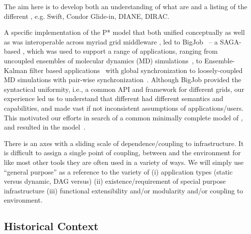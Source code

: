\documentclass{sig-alternate}
\begin{document}
The aim here is to develop both an understanding of what \pilotjobs
are and a listing of the different \pilotjobs, e.g. Swift, Condor
Glide-in, DIANE, DIRAC.


A specific implementation of the P* model that both unified
conceptually as well as was interoperable across myriad grid
middleware , led to 
BigJob~\cite{saga_bigjob_condor_cloud} -- a
SAGA-based \pilotjob, which was used to support a range of
applications, ranging from uncoupled ensembles of molecular dynamics
(MD) simulations~\cite{saga_bigjob_condor_cloud}, to Ensemble-Kalman
filter based applications~\cite{gmac09} with global synchronization to
loosely-coupled MD simulations with pair-wise
synchronization~\cite{async_repex11}.  Although BigJob provided the
syntactical uniformity, i.e., a common API and framework for different
grids, our experience led us to understand that different \pilotjobs
had different semantics and capabilities, and made vast if not
inconsistent assumptions of applications/users. This motivated our
efforts in search of a common minimally complete model of \pilotjobs,
and resulted in the \pstar model~\cite{pstar12}. 




There is an axes with a sliding scale of dependence/coupling to
infrastructure.  It is difficult to assign a single point of coupling,
between \pilotjobs and the environment for like most other tools they
are often used in a variety of ways.  We will simply use ``general
purpose'' as a reference to the variety of (i) application types
(static versus dynamic, DAG versus) (ii) existence/requirement of
special purpose infrastructure (iii) functional extensibility and/or
modularity and/or coupling to environment.

\subsection{Historical Context}
\end{document}
